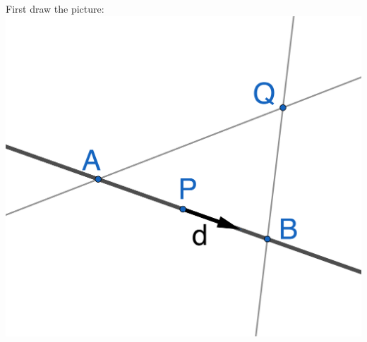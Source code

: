 \documentclass{article}
\begin{document}
\begin{Answer}
  First draw the picture:\\

  \includegraphics[scale=0.5]{lines-pt-at-dist-3.png}\\


\end{Answer}
\end{document}
